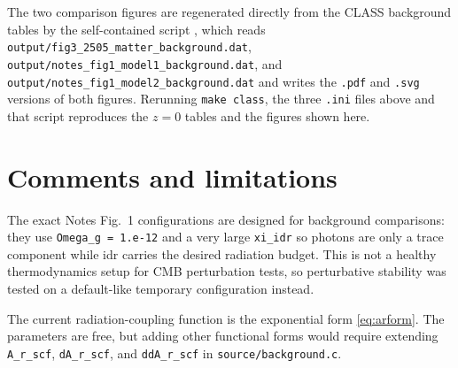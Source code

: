 \documentclass[11pt,a4paper,english,twoside]{article}
\begin{document}
The two comparison figures are regenerated directly from the CLASS background
tables by the self-contained script
, which reads
\texttt{output/fig3\_2505\_matter\_background.dat},
\texttt{output/notes\_fig1\_model1\_background.dat}, and
\texttt{output/notes\_fig1\_model2\_background.dat} and writes the \texttt{.pdf}
and \texttt{.svg} versions of both figures.  Rerunning \texttt{make class}, the
three \texttt{.ini} files above and that script reproduces the $z=0$ tables and
the figures shown here.

\section{Comments and limitations}

The exact Notes Fig.~1 configurations are designed for background comparisons:
they use \texttt{Omega\_g = 1.e-12} and a very large \texttt{xi\_idr} so photons are
only a trace component while idr carries the desired radiation budget.  This is not
a healthy thermodynamics setup for CMB perturbation tests, so perturbative stability
was tested on a default-like temporary configuration instead.

The current radiation-coupling function is the exponential form
\eqref{eq:arform}.  The parameters are free, but adding other functional forms would
require extending \texttt{A\_r\_scf}, \texttt{dA\_r\_scf}, and
\texttt{ddA\_r\_scf} in \texttt{source/background.c}.
\end{document}
